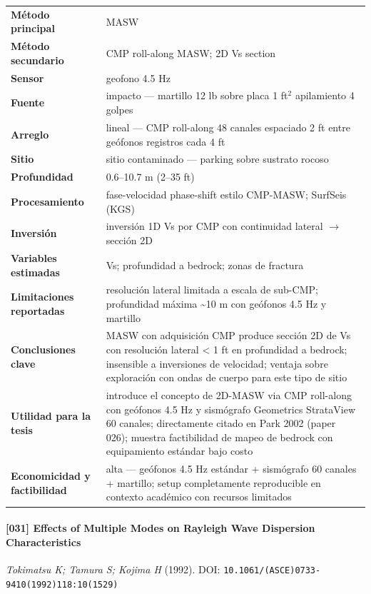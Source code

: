 \begin{center}\scriptsize
\begin{tabularx}{\textwidth}{@{}>{\bfseries}p{3.3cm} X@{}}
\toprule
M\'etodo principal & MASW \\
M\'etodo secundario & CMP roll-along MASW; 2D Vs section \\
Sensor & geofono 4.5 Hz \\
Fuente & impacto --- martillo 12 lb sobre placa 1 ft$^2$ apilamiento 4 golpes \\
Arreglo & lineal --- CMP roll-along 48 canales espaciado 2 ft entre geófonos registros cada 4 ft \\
Sitio & sitio contaminado --- parking sobre sustrato rocoso \\
Profundidad & 0.6--10.7 m (2--35 ft) \\
Procesamiento & fase-velocidad phase-shift estilo CMP-MASW; SurfSeis (KGS) \\
Inversi\'on & inversión 1D Vs por CMP con continuidad lateral $\rightarrow$ sección 2D \\
Variables estimadas & Vs; profundidad a bedrock; zonas de fractura \\
Limitaciones reportadas & resolución lateral limitada a escala de sub-CMP; profundidad máxima \textasciitilde{}10 m con geófonos 4.5 Hz y martillo \\
Conclusiones clave & MASW con adquisición CMP produce sección 2D de Vs con resolución lateral < 1 ft en profundidad a bedrock; insensible a inversiones de velocidad; ventaja sobre exploración con ondas de cuerpo para este tipo de sitio \\
Utilidad para la tesis & introduce el concepto de 2D-MASW via CMP roll-along con geófonos 4.5 Hz y sismógrafo Geometrics StrataView 60 canales; directamente citado en Park 2002 (paper 026); muestra factibilidad de mapeo de bedrock con equipamiento estándar bajo costo \\
Economicidad y factibilidad & alta --- geófonos 4.5 Hz estándar + sismógrafo 60 canales + martillo; setup completamente reproducible en contexto académico con recursos limitados \\
\bottomrule
\end{tabularx}
\end{center}

\paragraph{[031] Effects of Multiple Modes on Rayleigh Wave Dispersion Characteristics} \emph{Tokimatsu K; Tamura S; Kojima H} (1992).
{\scriptsize DOI: \texttt{10.1061/(ASCE)0733-9410(1992)118:10(1529)}}

